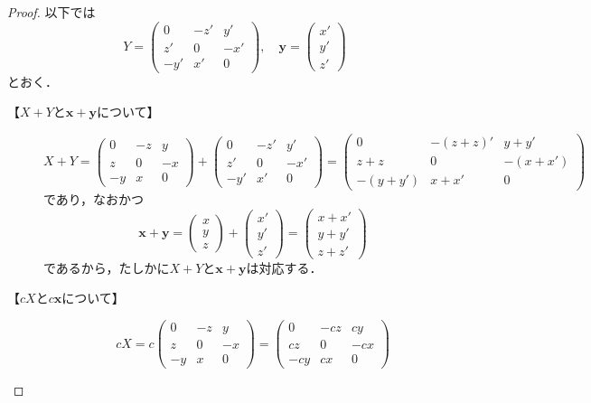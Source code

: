 \documentclass[a4paper,10pt,fleqn]{ltjsarticle}
\begin{document}
\begin{leftbar}
  \begin{proof}
    以下では
    \[
      Y = \begin{pmatrix} 0 & -z ' & y ' \\ z' & 0 & -x' \\ -y' & x ' & 0 \end{pmatrix},\quad \bm{y} = \begin{pmatrix} x' \\ y ' \\ z ' \end{pmatrix}
    \]
    とおく．
    \begin{description}
      \item[【$X+Y$と$\bm{x}+\bm{y}$について】]
            \[
              X + Y  = \begin{pmatrix} 0 & -z & y \\ z & 0 & -x \\ -y & x & 0 \end{pmatrix}+ \begin{pmatrix} 0 & -z ' & y ' \\ z' & 0 & -x' \\ -y' & x ' & 0 \end{pmatrix} = \begin{pmatrix} 0 & -(z+z)' & y+y' \\ z+z & 0 & -(x+x') \\ -(y+y') & x+x' & 0 \end{pmatrix}
            \]
            であり，なおかつ
            \[
              \bm{x}+\bm{y} =\begin{pmatrix} x \\ y \\ z \end{pmatrix}+ \begin{pmatrix} x' \\ y' \\ z' \end{pmatrix} = \begin{pmatrix} x+x' \\ y+y' \\ z+z' \end{pmatrix}
            \]
            であるから，たしかに$X+Y$と$\bm{x}+\bm{y}$は対応する．
      \item[【$cX$と$c\bm{x}$について】]
            \[
              cX =c\begin{pmatrix} 0 & -z & y \\ z & 0 & -x \\ -y & x & 0 \end{pmatrix} =\begin{pmatrix} 0 & -cz & cy \\ cz & 0 & -cx \\ -cy & cx & 0 \end{pmatrix}
\]
\end{description}
\end{proof}
\end{leftbar}
\end{document}
